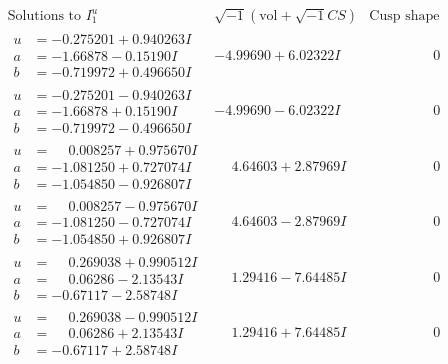 \documentclass[1p]{elsarticle_modified}
\theoremstyle{definition}
\newcommand{\I}{\sqrt{-1}}
\begin{document}
$$\begin{array}{c|c|c}  
\text{Solutions to }I^u_{1}& \I (\text{vol} + \sqrt{-1}CS) & \text{Cusp shape}\\
 \hline 
\begin{aligned}
u &= -0.275201 + 0.940263 I \\
a &= -1.66878 - 0.15190 I \\
b &= -0.719972 + 0.496650 I\end{aligned}
 & -4.99690 + 6.02322 I & \phantom{-0.000000 } 0 \\ \hline\begin{aligned}
u &= -0.275201 - 0.940263 I \\
a &= -1.66878 + 0.15190 I \\
b &= -0.719972 - 0.496650 I\end{aligned}
 & -4.99690 - 6.02322 I & \phantom{-0.000000 } 0 \\ \hline\begin{aligned}
u &= \phantom{-}0.008257 + 0.975670 I \\
a &= -1.081250 + 0.727074 I \\
b &= -1.054850 - 0.926807 I\end{aligned}
 & \phantom{-}4.64603 + 2.87969 I & \phantom{-0.000000 } 0 \\ \hline\begin{aligned}
u &= \phantom{-}0.008257 - 0.975670 I \\
a &= -1.081250 - 0.727074 I \\
b &= -1.054850 + 0.926807 I\end{aligned}
 & \phantom{-}4.64603 - 2.87969 I & \phantom{-0.000000 } 0 \\ \hline\begin{aligned}
u &= \phantom{-}0.269038 + 0.990512 I \\
a &= \phantom{-}0.06286 - 2.13543 I \\
b &= -0.67117 - 2.58748 I\end{aligned}
 & \phantom{-}1.29416 - 7.64485 I & \phantom{-0.000000 } 0 \\ \hline\begin{aligned}
u &= \phantom{-}0.269038 - 0.990512 I \\
a &= \phantom{-}0.06286 + 2.13543 I \\
b &= -0.67117 + 2.58748 I\end{aligned}
 & \phantom{-}1.29416 + 7.64485 I & \phantom{-0.000000 } 0 \\ \hline\begin{aligned}

\end{aligned}
\end{array}$$
\end{document}
